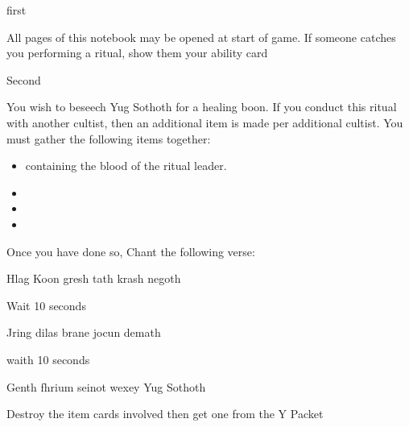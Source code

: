 \documentclass[greennotebook]{guildcamp4} %
\begin{document}
\startnotebook{\nRasputinYog{}}

\begin{page}{first}
	
	All pages of this notebook may be opened at start of game.  If someone catches you performing a ritual, show them your ability card \aRitual{}
	
\end{page}

\begin{page}{Second}
		
		You wish to beseech Yug Sothoth for a healing boon. If you conduct this ritual with another cultist, then an additional item is made per additional cultist. You must gather the following items together: 
		
		\begin{itemize}
			\item \iTestTube{} containing the blood of the ritual leader.
			\item \iSieve{}
			\item \iCauldron{}
			\item \iIsotope{}
		\end{itemize}
	
		Once you have done so, Chant the following verse:
		
		Hlag Koon gresh tath krash negoth
		
		Wait 10 seconds
		
		Jring dilas brane jocun demath
		
		waith 10 seconds
		
		Genth fhrium seinot wexey Yug Sothoth
		
		Destroy the item cards involved then get one \iHealthPotion{} from the Y Packet 

	\end{page}
	
\end{document}
